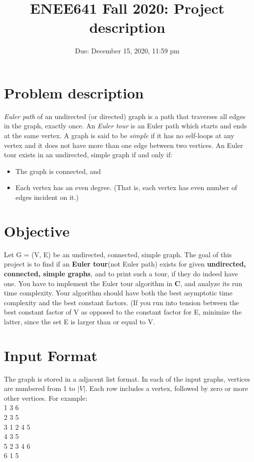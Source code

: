 \documentclass{article}
\title{ENEE641 Fall 2020: Project description}
\author{Due: December 15, 2020, 11:59 pm}
\date{}
\begin{document}
\maketitle

\section{Problem description}
\emph{Euler path} of an undirected (or directed) graph is a path that traverses all edges in the graph, exactly once. An \emph{Euler tour} is an Euler path which starts and ends at the same vertex. A graph is said to be \emph{simple} if it has no self-loops at any vertex and it does not have more than one edge between two vertices. An Euler tour exists in an undirected, simple graph if and only if:
\begin{itemize}
    \item The graph is connected, and
    \item Each vertex has an even degree. (That is, each vertex has even number of edges incident on it.)
\end{itemize}

\section{Objective}
Let G = (V, E) be an undirected, connected, simple graph. The goal of this project is to find if an \textbf{Euler tour}(not Euler path) exists for given \textbf{undirected, connected, simple graphs}, and to print such a tour, if they do indeed have one. You have to implement the Euler tour algorithm in \textbf{C}, and analyze its run time complexity. Your algorithm should have both the best asymptotic time complexity and the best constant factors. (If you run into tension between the best constant factor of V as opposed to the constant factor for E, minimize the latter, since the set E is larger than or equal to V.

\section{Input Format}\label{sec:3}
The graph is stored in a adjacent list format. In each of the input graphs, vertices are numbered from 1 to $|V|$. Each row includes a
vertex, followed by zero or more other vertices. For example:\\
1 3 6\\
2 3 5\\
3 1 2 4 5\\
4 3 5\\
5 2 3 4 6\\
6 1 5\\
\end{document}

